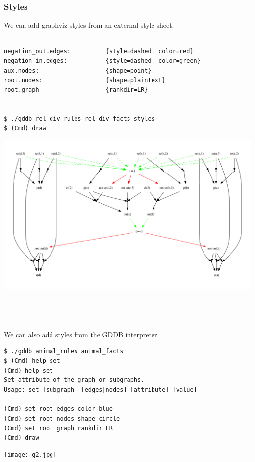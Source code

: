 \documentclass[12pt]{report}
\begin{document}
\subsubsection*{Styles}
We can add graphviz styles from an external style sheet.
\begin{verbatim}

negation_out.edges:          {style=dashed, color=red}               
negation_in.edges:           {style=dashed, color=green}               
aux.nodes:                   {shape=point}
root.nodes:                  {shape=plaintext}
root.graph                   {rankdir=LR}


$ ./gddb rel_div_rules rel_div_facts styles
$ (Cmd) draw
\end{verbatim}
\includegraphics[scale=0.45]{relation_division.pdf} \\
\bigskip \\
\bigskip \\
\\
\\
We can also add styles from the GDDB interpreter.
\begin{verbatim}
$ ./gddb animal_rules animal_facts
$ (Cmd) help set
(Cmd) help set
Set attribute of the graph or subgraphs.
Usage: set [subgraph] [edges|nodes] [attribute] [value]

(Cmd) set root edges color blue
(Cmd) set root nodes shape circle
(Cmd) set root graph rankdir LR
(Cmd) draw
\end{verbatim}
\texttt{[image: g2.jpg]} \\
\end{document}
